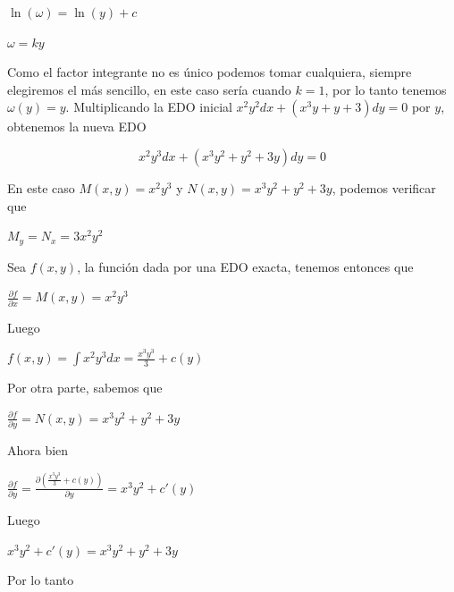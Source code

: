 \documentclass{article}
\theoremstyle{plain}
\theoremstyle{definition}
\begin{document}
\begin{center}
$\ln(\omega)= \ln(y)+c$
\end{center}




\begin{center}
$\omega= ky$
\end{center}

Como el factor integrante no es único podemos tomar cualquiera, siempre elegiremos el más sencillo, en este caso sería cuando $k=1$, por lo tanto tenemos
$\omega(y)=y$. Multiplicando la EDO inicial $x^2y^2dx+ (x^3y+y+3)dy=0$ por $y$, obtenemos la nueva EDO

\begin{center}
$$x^2y^3dx+ (x^3y^2+y^2+3y)dy=0$$
\end{center}


En este caso $M(x,y)= x^2y^3$ y $N(x,y)=x^3y^2+y^2+3y$, podemos verificar que

\begin{center}
$\displaystyle M_y=N_x= 3x^2y^2$
\end{center}

Sea $f(x,y)$, la función dada por una EDO exacta, tenemos entonces que

\begin{center}
$\displaystyle \frac{\partial f}{\partial x} =M(x,y) = x^2y^3$
\end{center}

Luego

\begin{center}
$\displaystyle f(x,y) = \int x^2y^3 dx = \frac{x^3y^3}{3} +c(y)$
\end{center}

Por otra parte, sabemos que

\begin{center}
$\displaystyle \frac{\partial f}{\partial y} = N(x,y)= x^3y^2+y^2+3y$
\end{center}

Ahora bien

\begin{center}
$\displaystyle \frac{\partial f}{\partial y} = \frac{\partial \left( \frac{x^3y^3}{3} +c(y) \right) }{\partial y} = x^3y^2+c'(y)$
\end{center}


Luego

\begin{center}
$ x^3y^2+c'(y) =  x^3y^2+y^2+3y$
\end{center}

Por lo tanto
\end{document}
